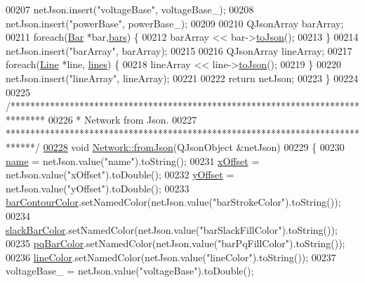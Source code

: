 \begin{DoxyCode}
00207   netJson.insert(\textcolor{stringliteral}{"voltageBase"}, voltageBase\_);
00208   netJson.insert(\textcolor{stringliteral}{"powerBase"}, powerBase\_);
00209 
00210   QJsonArray barArray;
00211   \textcolor{keywordflow}{foreach}(\hyperlink{class_bar}{Bar} *bar,\hyperlink{class_network_ae37a8418e42adf765b143cdc9d992b6c}{bars}) \{
00212     barArray << bar->\hyperlink{group___models_ga3eb84c42b687db6cd98e11b8bd38c86e}{toJson}();
00213   \}
00214   netJson.insert(\textcolor{stringliteral}{"barArray"}, barArray);
00215 
00216   QJsonArray lineArray;
00217   \textcolor{keywordflow}{foreach}(\hyperlink{class_line}{Line} *line, \hyperlink{class_network_a49659f95d02baf087707c5a94fa23d90}{lines}) \{
00218     lineArray << line->\hyperlink{group___models_ga4effa7a96db465ea6e01135d5a010739}{toJson}();
00219   \}
00220   netJson.insert(\textcolor{stringliteral}{"lineArray"}, lineArray);
00221 
00222   \textcolor{keywordflow}{return} netJson;
00223 \}
00224 
00225 \textcolor{comment}{/*******************************************************************************}
00226 \textcolor{comment}{ *  Network from Json.}
00227 \textcolor{comment}{ ******************************************************************************/}
\hypertarget{network_8cpp_source_l00228}{}\hyperlink{group___models_ga2aef0f6c0d9569ec4d6b948d1ef0d5f1}{00228} \textcolor{keywordtype}{void} \hyperlink{group___models_ga2aef0f6c0d9569ec4d6b948d1ef0d5f1}{Network::fromJson}(QJsonObject &netJson)
00229 \{
00230   \hyperlink{class_network_ab6643733a517f930c60b06f5ffd78186}{name} = netJson.value(\textcolor{stringliteral}{"name"}).toString();
00231   \hyperlink{class_network_a9f5c70be28a45320802bd0ac3947d114}{xOffset} = netJson.value(\textcolor{stringliteral}{"xOffset"}).toDouble();
00232   \hyperlink{class_network_a771b16f7eb4459d0ca7141c048b1ab59}{yOffset} = netJson.value(\textcolor{stringliteral}{"yOffset"}).toDouble();
00233   \hyperlink{class_network_a20c58a0630bdbbade527d55ba48d924c}{barContourColor}.setNamedColor(netJson.value(\textcolor{stringliteral}{"barStrokeColor"}).toString());
00234   \hyperlink{class_network_ac6c44cb1f88cd67a4fab7eff948e2d1d}{slackBarColor}.setNamedColor(netJson.value(\textcolor{stringliteral}{"barSlackFillColor"}).toString());
00235   \hyperlink{class_network_a610c48c9e2dd9555f9b354ab72fb96cc}{pqBarColor}.setNamedColor(netJson.value(\textcolor{stringliteral}{"barPqFillColor"}).toString());
00236   \hyperlink{class_network_a453db7f1a994603fe4d38ac5899eb09c}{lineColor}.setNamedColor(netJson.value(\textcolor{stringliteral}{"lineColor"}).toString());
00237   voltageBase\_ = netJson.value(\textcolor{stringliteral}{"voltageBase"}).toDouble();

\end{DoxyCode}
